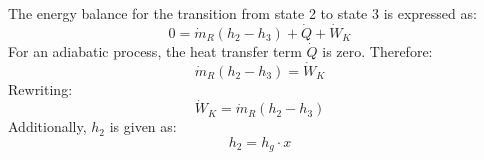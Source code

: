 The energy balance for the transition from state 2 to state 3 is expressed as:  
\[
0 = \dot{m}_R (h_2 - h_3) + \dot{Q} + \dot{W}_K
\]  
For an adiabatic process, the heat transfer term \( \dot{Q} \) is zero. Therefore:  
\[
\dot{m}_R (h_2 - h_3) = \dot{W}_K
\]  
Rewriting:  
\[
\dot{W}_K = \dot{m}_R (h_2 - h_3)
\]  
Additionally, \( h_2 \) is given as:  
\[
h_2 = h_g \cdot x
\]